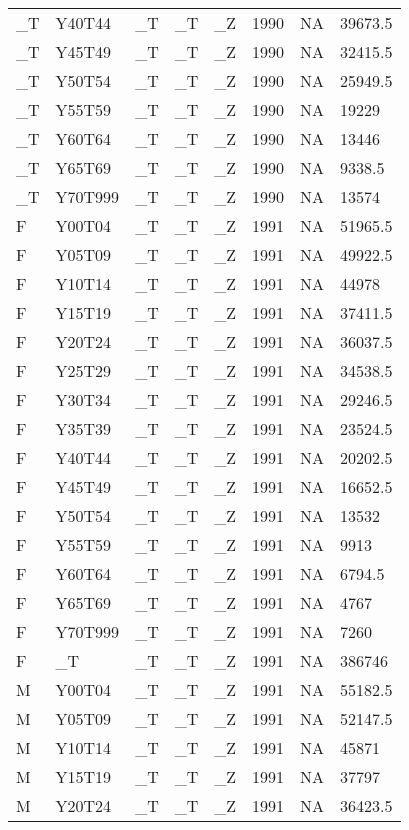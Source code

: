 \begin{longtable}[t]{llllllll}
\addlinespace
\_T & Y40T44 & \_T & \_T & \_Z & 1990 & NA & 39673.5\\
\_T & Y45T49 & \_T & \_T & \_Z & 1990 & NA & 32415.5\\
\_T & Y50T54 & \_T & \_T & \_Z & 1990 & NA & 25949.5\\
\_T & Y55T59 & \_T & \_T & \_Z & 1990 & NA & 19229\\
\_T & Y60T64 & \_T & \_T & \_Z & 1990 & NA & 13446\\
\addlinespace
\_T & Y65T69 & \_T & \_T & \_Z & 1990 & NA & 9338.5\\
\_T & Y70T999 & \_T & \_T & \_Z & 1990 & NA & 13574\\
F & Y00T04 & \_T & \_T & \_Z & 1991 & NA & 51965.5\\
F & Y05T09 & \_T & \_T & \_Z & 1991 & NA & 49922.5\\
F & Y10T14 & \_T & \_T & \_Z & 1991 & NA & 44978\\
\addlinespace
F & Y15T19 & \_T & \_T & \_Z & 1991 & NA & 37411.5\\
F & Y20T24 & \_T & \_T & \_Z & 1991 & NA & 36037.5\\
F & Y25T29 & \_T & \_T & \_Z & 1991 & NA & 34538.5\\
F & Y30T34 & \_T & \_T & \_Z & 1991 & NA & 29246.5\\
F & Y35T39 & \_T & \_T & \_Z & 1991 & NA & 23524.5\\
\addlinespace
F & Y40T44 & \_T & \_T & \_Z & 1991 & NA & 20202.5\\
F & Y45T49 & \_T & \_T & \_Z & 1991 & NA & 16652.5\\
F & Y50T54 & \_T & \_T & \_Z & 1991 & NA & 13532\\
F & Y55T59 & \_T & \_T & \_Z & 1991 & NA & 9913\\
F & Y60T64 & \_T & \_T & \_Z & 1991 & NA & 6794.5\\
\addlinespace
F & Y65T69 & \_T & \_T & \_Z & 1991 & NA & 4767\\
F & Y70T999 & \_T & \_T & \_Z & 1991 & NA & 7260\\
F & \_T & \_T & \_T & \_Z & 1991 & NA & 386746\\
M & Y00T04 & \_T & \_T & \_Z & 1991 & NA & 55182.5\\
M & Y05T09 & \_T & \_T & \_Z & 1991 & NA & 52147.5\\
\addlinespace
M & Y10T14 & \_T & \_T & \_Z & 1991 & NA & 45871\\
M & Y15T19 & \_T & \_T & \_Z & 1991 & NA & 37797\\
M & Y20T24 & \_T & \_T & \_Z & 1991 & NA & 36423.5\\

\end{longtable}
